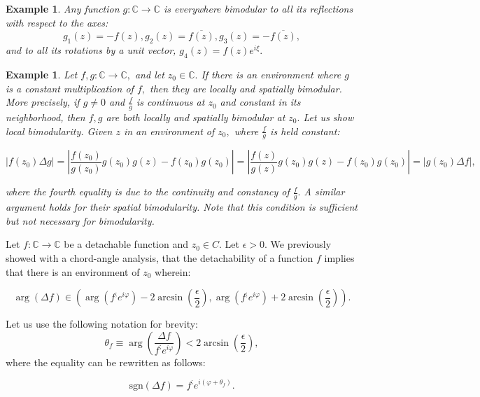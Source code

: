 \documentclass[11pt]{book}
\newtheorem{exm}[thm]{Example}
\begin{document}
\begin{exm}Any function $g:\mathbb{C}\longrightarrow\mathbb{C}$ is everywhere bimodular to all its reflections with respect to the axes: $$g_{1}\left(z\right)=-f\left(z\right), g_{2}\left(z\right)=\overline{f\left(z\right)}, g_{3}\left(z\right)=-\overline{f\left(z\right)},$$ and to all its rotations by a unit vector, $g_{4}\left(z\right)=f\left(z\right)e^{i\xi}.$
\end{exm}

\begin{exm}Let $f,g:\mathbb{C}\longrightarrow\mathbb{C},$ and let $z_{0}\in\mathbb{C}.$ If there is an environment where $g$ is a constant multiplication of $f,$ then they are locally and spatially bimodular. More precisely, if $g\neq0$ and $\frac{f}{g}$ is continuous at $z_{0}$ and constant in its neighborhood, then $f,g$ are both locally and spatially bimodular at $z_{0}.$ Let us show local bimodularity. Given $z$ in an environment of $z_{0}, $ where $\frac{f}{g}$ is held constant:

$$\left|f\left(z_{0}\right)\Delta g\right| =\left|\frac{f\left(z_{0}\right)}{g\left(z_{0}\right)}g\left(z_{0}\right)g\left(z\right)-f\left(z_{0}\right)g\left(z_{0}\right)\right|=\left|\frac{f\left(z\right)}{g\left(z\right)}g\left(z_{0}\right)g\left(z\right)-f\left(z_{0}\right)g\left(z_{0}\right)\right|=\left|g\left(z_{0}\right)\Delta f\right|,$$

where the fourth equality is due to the continuity and constancy of $\frac{f}{g}.$
A similar argument holds for their spatial bimodularity. Note that this condition is sufficient but not necessary for bimodularity.
\end{exm}

\begin{remark}Let $f:\mathbb{C}\longrightarrow\mathbb{C}$ be a detachable function and $z_{0}\in C.$ Let $\epsilon>0.$ We previously showed with a chord-angle analysis, that the detachability of a function $f$ implies that there is an environment of $z_{0}$ wherein:

$$\arg\left(\Delta f\right)\in\left(\arg\left(f^{;}e^{i\varphi}\right)-2\arcsin\left(\frac{\epsilon}{2}\right),\arg\left(f^{;}e^{i\varphi}\right)+2\arcsin\left(\frac{\epsilon}{2}\right)\right).$$

Let us use the following notation for brevity:
$$\theta_{f}\equiv\arg\left(\frac{\Delta f}{f^{;}e^{i\varphi}}\right)<2\arcsin\left(\frac{\epsilon}{2}\right)\label{theta_f_bound},$$ where the equality can be rewritten as follows:

$$\text{sgn}\left(\Delta f\right)=f^{;}e^{i\left(\varphi+\theta_{f}\right)}\label{sgn_df_formula}.$$
\end{remark}
\end{document}
